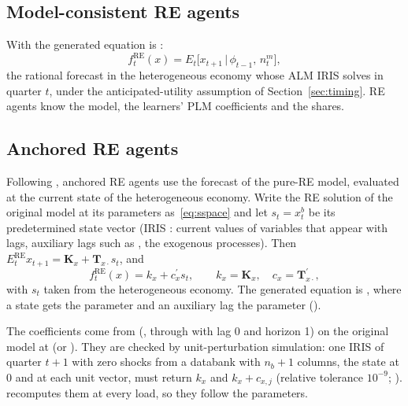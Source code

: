 \documentclass[11pt,a4paper]{article}
\newcommand{\RE}{\mathrm{RE}}
\newcommand{\fRE}{f^{\RE}}
\newcommand{\T}{\mathbf{T}}
\newcommand{\K}{\mathbf{K}}
\newcommand{\transp}{^{\prime}}
\begin{document}
\subsection{Model-consistent RE agents}\label{sec:mc}

With  the generated equation is :
\begin{equation}\label{eq:mc}
  \fRE_t(x) = E_t\bigl[x_{t+1} \,\big|\, \phi_{t-1},\, n^m_{t}\bigr],
\end{equation}
the rational forecast in the heterogeneous economy whose ALM IRIS solves in quarter $t$, under
the anticipated-utility assumption of Section~\ref{sec:timing}. RE agents know the model, the
learners' PLM coefficients and the shares.

\subsection{Anchored RE agents}\label{sec:anchored}

Following \citet[sec.~2.3.1]{ozden2025}, anchored RE agents use the forecast of the pure-RE
model, evaluated at the current state of the heterogeneous economy. Write the RE solution of the
original model at its parameters as~\eqref{eq:sspace} and let $s_t = x^b_t$ be its predetermined
state vector (IRIS : current values of variables that appear with lags, auxiliary
lags such as , the exogenous processes). Then $E^{\RE}_t x_{t+1} = \K_x + \T_{x\cdot}
s_t$, and
\begin{equation}\label{eq:anchored}
  \fRE_t(x) = k_x + c_x\transp s_t, \qquad k_x = \K_x,\quad c_x = \T_{x\cdot}\transp ,
\end{equation}
with $s_t$ taken from the heterogeneous economy. The generated equation is
, where a state  gets the
parameter  and an auxiliary lag  the parameter 
().

The coefficients come from 
(, through  with lag 0 and horizon 1)
on the original model at  (or ). They are checked by
unit-perturbation simulation: one IRIS  of quarter $t+1$ with zero shocks from a
databank with $n_b+1$ columns, the state at 0 and at each unit vector, must return $k_x$ and
$k_x + c_{x,j}$ (relative tolerance $10^{-9}$; ).
 recomputes them at every load, so they follow the parameters.
\end{document}
